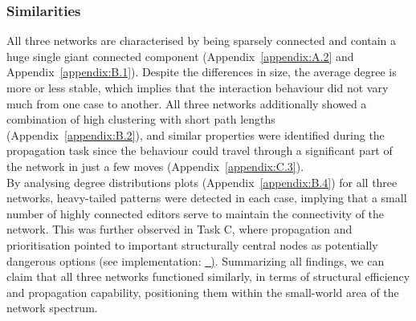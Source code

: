 \documentclass[acmsmall,nonacm,natbib=false]{acmart}
\newcommand{\githublink}[2]{\href{#1}{\faGithub\ #2}}
\begin{document}
\subsubsection{\textbf{\Large{Similarities}}}
\leavevmode \par \noindent
All three networks are characterised by being sparsely connected and contain a huge single giant connected component (Appendix~\ref{appendix:A.2} and Appendix~\ref{appendix:B.1}). Despite the differences in size, the average degree is more or less stable, which implies that the interaction behaviour did not vary much from one case to another. All three networks additionally showed a combination of high clustering with short path lengths (Appendix~\ref{appendix:B.2}), and similar properties were identified during the propagation task since the behaviour could travel through a significant part of the network in just a few moves (Appendix~\ref{appendix:C.3}).\\
By analysing degree distributions plots (Appendix~\ref{appendix:B.4}) for all three networks, heavy-tailed patterns were detected in each case, implying that a small number of highly connected editors serve to maintain the connectivity of the network. This was further observed in Task C, where propagation and prioritisation pointed to important structurally central nodes as potentially dangerous options (see implementation: \githublink{https://github.kcl.ac.uk/k25038453/network-data-analysis-coursework/blob/main/notebooks/part\_1/taskC.ipynb}). Summarizing all findings, we can claim that all three networks functioned similarly, in terms of structural efficiency and propagation capability, positioning them within the small-world area of the network spectrum.
\end{document}
